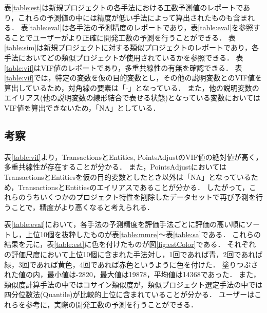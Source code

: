 表\ref{table:est}は新規プロジェクトの各手法における工数予測値のレポートであり，これらの予測値の中には精度が低い手法によって算出されたものも含まれる．
表\ref{table:eval}は各手法の予測精度のレポートであり，表\ref{table:eval}を参照することでユーザーがより正確に開発工数の予測を行うことができる．
表\ref{table:sim}は新規プロジェクトに対する類似プロジェクトのレポートであり，各手法においてどの類似プロジェクトが使用されているかを参照できる．
表\ref{table:vif}はVIF値のレポートであり，多重共線性の有無を確認できる．
表\ref{table:vif}では，特定の変数を仮の目的変数とし，その他の説明変数とのVIF値を算出しているため，対角線の要素は「-」となっている．
また，他の説明変数のエイリアス(他の説明変数の線形結合で表せる状態)となっている変数においてはVIF値を算出できないため，「NA」としている．

\clearpage
\subsection{考察}

表\ref{table:vif}より，TransactionsとEntities, PointsAdjustのVIF値の絶対値が高く，多重共線性が存在することが分かる．
また，PointsAdjustにおいてはTransactionsとEntitiesを仮の目的変数としたとき以外は「NA」となっているため，TransactionsとEntitiesのエイリアスであることが分かる．
したがって，これらのうちいくつかのプロジェクト特性を削除したデータセットで再び予測を行うことで，精度がより高くなると考えられる．

表\ref{table:eval}において，各手法の予測精度を評価手法ごとに評価の高い順にソートし，上位10個を抜粋したものが表\ref{table:mmre}～表\ref{table:sa}である．
これらの結果を元に，表\ref{table:est}に色を付けたものが図\ref{fig:estColor}である．
それぞれの評価尺度において上位10個に含まれた手法対し，1回であれば青，2回であれば緑，3回であれば黄色，4回であれば赤色というように色を付けた．
塗りつぶされた値の内，最小値は-2820，最大値は19878，平均値は14368であった．
また，類似度計算手法の中ではコサイン類似度が，類似プロジェクト選定手法の中では四分位数法(Quantile)が比較的上位に含まれていることが分かる．
ユーザーはこれらを参考に，実際の開発工数の予測を行うことができる．

